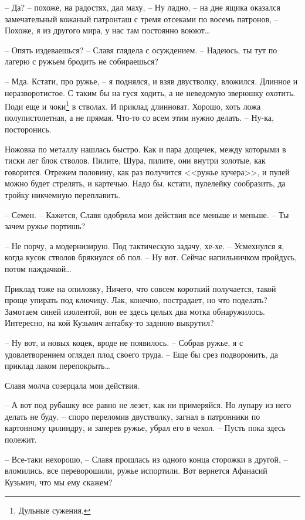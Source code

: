 \documentclass[a4paper]{book}
\begin{document}
-- Да? -- похоже, на радостях, дал маху, -- Ну ладно, -- на дне ящика оказался замечательный кожаный патронташ с тремя отсеками по восемь патронов, -- Похоже, я из другого мира, у нас там постоянно воюют\ldots

-- Опять издеваешься? -- Славя глядела с осуждением. -- Надеюсь, ты тут по лагерю с ружьем бродить не собираешься?

-- Мда. Кстати, про ружье, -- я поднялся, и взяв двустволку, вложился. Длинное и неразворотистое. С таким бы на гуся ходить, а не неведомую зверюшку охотить. Поди еще и чоки\footnote{Дульные сужения.} в стволах. И приклад длинноват. Хорошо, хоть ложа полупистолетная, а не прямая. Что-то со всем этим нужно делать. -- Ну-ка, посторонись. 

Ножовка по металлу нашлась быстро. Как и пара дощечек, между которыми в тиски лег блок стволов. Пилите, Шура, пилите, они внутри золотые, как говорится. Отрежем половину, как раз получится <<ружье кучера>>, и пулей можно будет стрелять, и картечью. Надо бы, кстати, пулелейку сообразить, да тройку никчемную переплавить.

-- Семен. -- Кажется, Славя одобряла мои действия все меньше и меньше. -- Ты зачем ружье портишь? 

-- Не порчу, а модернизирую. Под тактическую задачу, хе-хе. -- Усмехнулся я, когда кусок стволов брякнулся об пол. -- Ну вот. Сейчас напильничком пройдусь, потом наждачкой\ldots 

Приклад тоже на опиловку, Ничего, что совсем короткий получается, такой проще упирать под ключицу. Лак, конечно, пострадает, но что поделать? Замотаем синей изолентой, вон ее здесь целых два мотка обнаружилось. Интересно, на кой Кузьмич антабку-то заднюю выкрутил?  

-- Ну вот, и новых коцек, вроде не появилось. -- Собрав ружье, я с удовлетворением  оглядел плод  своего труда.  -- Еще бы срез подворонить, да приклад лаком перепокрыть\ldots

Славя молча созерцала мои действия.

-- А вот под рубашку все равно не лезет, как ни примеряйся. Но лупару из него делать не буду. -- споро переломив двустволку, загнал в патронники по картонному цилиндру, и заперев ружье, убрал его в чехол. -- Пусть пока здесь полежит.

-- Все-таки нехорошо, -- Славя прошлась из одного конца сторожки в другой, -- вломились, все переворошили, ружье испортили. Вот вернется Афанасий Кузьмич, что мы ему скажем?
\end{document}
